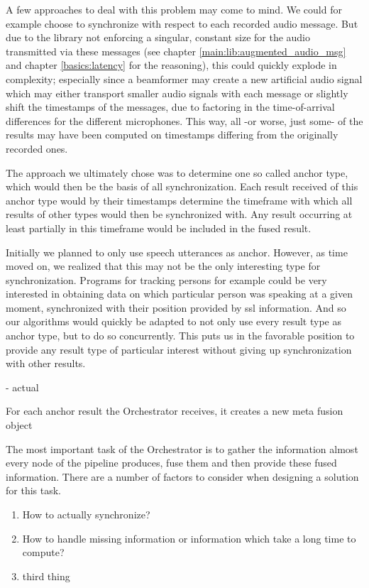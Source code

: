 A few approaches to deal with this problem may come to mind.
We could for example choose to synchronize with respect to each recorded audio message.
But due to the library not enforcing a singular, constant size for the audio transmitted via these messages (see chapter \ref{main:lib:augmented_audio_msg} and chapter \ref{basics:latency} for the reasoning), this could quickly explode in complexity; especially since a beamformer may create a new artificial audio signal which may either transport smaller audio signals with each message or slightly shift the timestamps of the messages, due to factoring in the time-of-arrival differences for the different microphones.
This way, all -or worse, just some- of the results may have been computed on timestamps differing from the originally recorded ones.

The approach we ultimately chose was to determine one so called anchor type, which would then be the basis of all synchronization.
Each result received of this anchor type would by their timestamps determine the timeframe with which all results of other types would then be synchronized with.
Any result occurring at least partially in this timeframe would be included in the fused result.

Initially we planned to only use speech utterances as anchor.
However, as time moved on, we realized that this may not be the only interesting type for synchronization.
Programs for tracking persons for example could be very interested in obtaining data on which particular person was speaking at a given moment, synchronized with their position provided by \gls{ssl} information.
And so our algorithms would quickly be adapted to not only use every result type as anchor type, but to do so concurrently.
This puts us in the favorable position to provide any result type of particular interest without giving up synchronization with other results.

- actual 

For each anchor result the Orchestrator receives, it creates a new meta fusion object



The most important task of the Orchestrator is to gather the information almost every node of the pipeline produces, fuse them and then provide these fused information.
There are a number of factors to consider when designing a solution for this task.
\begin{enumerate}
	\item How to actually synchronize?
	\item How to handle missing information or information which take a long time to compute?
	\item third thing
\end{enumerate}

